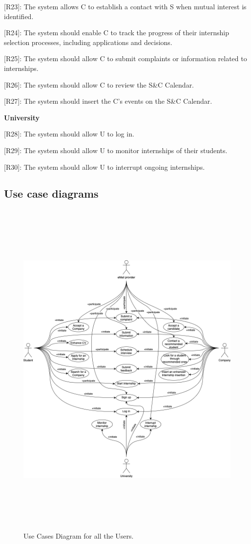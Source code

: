 {[}R23{]}: The system allows C to establish a contact with S when mutual
interest is identified.

{[}R24{]}: The system should enable C to track the progress of their
internship selection processes, including applications and decisions.~

{[}R25{]}: The system should allow C to submit complaints or information
related to internships.

{[}R26{]}: The system should allow C to review the S\&C Calendar.

{[}R27{]}: The system should insert the C's events on the S\&C Calendar.

\textbf{University}

{[}R28{]}: The system should allow U to log in.

{[}R29{]}: The system should allow U to monitor internships of their
students.

{[}R30{]}: The system should allow U to interrupt ongoing internships.


\subsection{Use case diagrams}
\label{subsec:use_case_diagrams}%


\begin{figure}[H]
    \begin{center}
        \includegraphics[width=6.5in,height=6.81319in]{Images/UCDiagram.png}
        \caption{Use Cases Diagram for all the Users.} 
        \label{fig:UnregisteredUC}%
        \end{center}
\end{figure}


